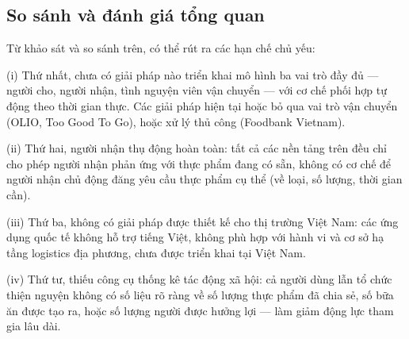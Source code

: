\documentclass[../main.tex]{subfiles}%
\begin{document}
\subsection{So sánh và đánh giá tổng quan}
\label{subsection:1.2.2}

\begin{table}[H]
\centering
{}
\caption{So sánh các giải pháp hiện có}
\label{tab:so_sanh_giai_phap_hien_co}
\end{table}

Từ khảo sát và so sánh trên, có thể rút ra các hạn chế chủ yếu:

(i) Thứ nhất, chưa có giải pháp nào triển khai mô hình ba vai trò đầy đủ — người cho, người nhận, tình nguyện viên vận chuyển — với cơ chế phối hợp tự động theo thời gian thực. Các giải pháp hiện tại hoặc bỏ qua vai trò vận chuyển (OLIO, Too Good To Go), hoặc xử lý thủ công (Foodbank Vietnam).

(ii) Thứ hai, người nhận thụ động hoàn toàn: tất cả các nền tảng trên đều chỉ cho phép người nhận phản ứng với thực phẩm đang có sẵn, không có cơ chế để người nhận chủ động đăng yêu cầu thực phẩm cụ thể (về loại, số lượng, thời gian cần).

(iii) Thứ ba, không có giải pháp được thiết kế cho thị trường Việt Nam: các ứng dụng quốc tế không hỗ trợ tiếng Việt, không phù hợp với hành vi và cơ sở hạ tầng logistics địa phương, chưa được triển khai tại Việt Nam.

(iv) Thứ tư, thiếu công cụ thống kê tác động xã hội: cả người dùng lẫn tổ chức thiện nguyện không có số liệu rõ ràng về số lượng thực phẩm đã chia sẻ, số bữa ăn được tạo ra, hoặc số lượng người được hưởng lợi — làm giảm động lực tham gia lâu dài.
\end{document}
